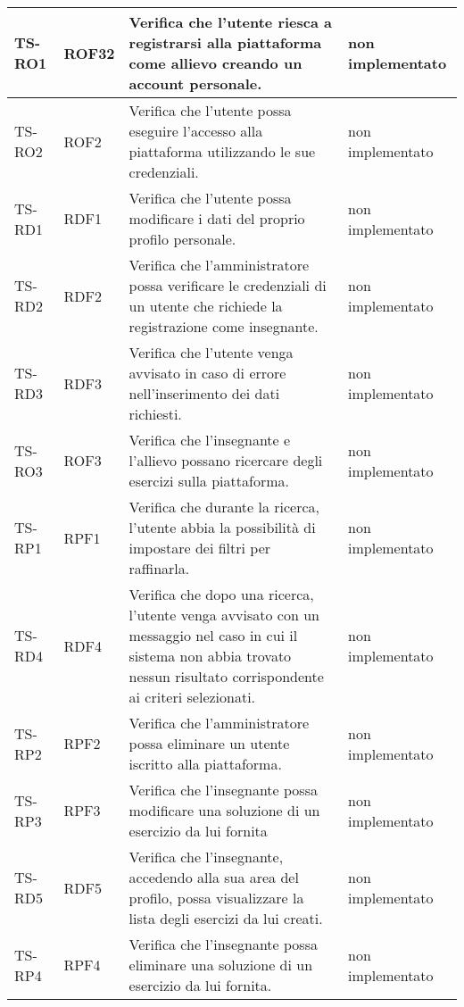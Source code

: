 \begin{longtable}{|>{\centering\arraybackslash}m{1.6cm}|>{\centering\arraybackslash}m{1.7cm}|m{6.41cm}|>{\centering\arraybackslash}m{3.1cm}|}
		\hline
		\rowcolor{LightGray}
		TS-RO1
		& ROF32
		& Verifica che l'utente riesca a registrarsi alla piattaforma come allievo creando un account personale. 
		& non implementato\\ \hline
		\rowcolor{white}
		TS-RO2
		& ROF2 
		& Verifica che l'utente possa eseguire l'accesso alla piattaforma utilizzando le sue credenziali.
		& non implementato\\ \hline
		\rowcolor{LightGray}
		TS-RD1
		& RDF1 
		& Verifica che l'utente possa modificare i dati del proprio profilo personale.
		& non implementato\\ \hline
		\rowcolor{white}
		TS-RD2
		& RDF2 
		& Verifica che l'amministratore possa verificare le credenziali di un utente che richiede la registrazione come insegnante. 
		& non implementato\\ \hline
		\rowcolor{LightGray}
		TS-RD3
		& RDF3 
		& Verifica che l'utente venga avvisato in caso di errore nell'inserimento dei dati richiesti.
		& non implementato\\ \hline
		\rowcolor{white}
		TS-RO3		
		& ROF3 
		& Verifica che l'insegnante e l'allievo possano ricercare degli esercizi sulla piattaforma.
		& non implementato\\ \hline
		\rowcolor{LightGray}
		TS-RP1		
		& RPF1 
		& Verifica che durante la ricerca, l'utente abbia la possibilità di impostare dei filtri per raffinarla. 		
		& non implementato\\ \hline
		\rowcolor{white}
		TS-RD4		
		& RDF4 
		& Verifica che dopo una ricerca, l'utente venga avvisato con un messaggio nel caso in cui il sistema non abbia trovato nessun risultato corrispondente ai criteri selezionati.
		& non implementato\\ \hline
		\rowcolor{LightGray}
		TS-RP2		
		& RPF2 
		& Verifica che l'amministratore possa eliminare un utente iscritto alla piattaforma.
		& non implementato\\ \hline
		\rowcolor{white}
		TS-RP3		
		& RPF3 
		& Verifica che l'insegnante possa modificare una soluzione di un esercizio da lui fornita
		& non implementato\\ \hline
		\rowcolor{LightGray}
		TS-RD5		
		& RDF5 
		& Verifica che l'insegnante, accedendo alla sua area del profilo, possa visualizzare la lista degli esercizi da lui creati. 
		& non implementato\\ \hline
		\rowcolor{white}
		TS-RP4		
		& RPF4 
		& Verifica che l'insegnante possa eliminare una soluzione di un esercizio da lui fornita. 
		& non implementato\\ \hline

\end{longtable}
